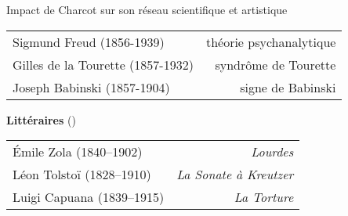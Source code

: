 \begin{frame}{Impact de Charcot sur son réseau scientifique et artistique}
    \begin{table}[!ht]
        \centering
        \begin{tabular}{l r}
           Sigmund Freud (1856-1939)  & théorie psychanalytique \\
            Gilles de la Tourette (1857-1932) & syndrôme de Tourette \\
            Joseph Babinski (1857-1904) & signe de Babinski \\
        \end{tabular}
        \label{tab:my_label}
    \end{table}
\medskip
\textbf{Littéraires} (\cite{koehler2013charcot}) 
\begin{table}[!ht]
    \centering
    \begin{tabular}{l r}
        Émile Zola (1840–1902)  & \textit{Lourdes} \\
        Léon Tolstoï (1828–1910) & \textit{La Sonate à Kreutzer} \\
        Luigi Capuana (1839–1915) & \textit{La Torture}
    \end{tabular}
    \label{tab:my_label}
\end{table}

\end{frame}

